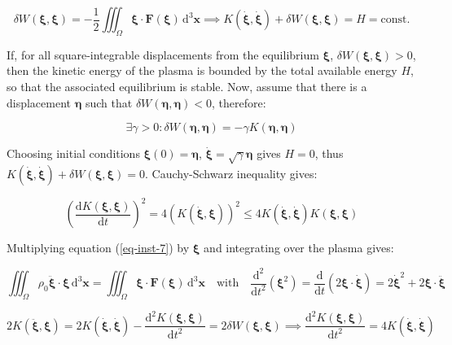 \begin{equation}
    \delta W(\boldsymbol{\xi},\boldsymbol{\xi})=-\frac{1}{2}\iiint_\Omega\boldsymbol{\xi}\cdot\mathbf{F}(\boldsymbol{\xi})\,\mathrm{d}^3\mathbf{x}\implies K(\dot{\boldsymbol{\xi}},\dot{\boldsymbol{\xi}})+\delta W(\boldsymbol{\xi},\boldsymbol{\xi})=H=\text{const.}
\end{equation}

If, for all square-integrable displacements from the equilibrium $\boldsymbol{\xi}$, $\delta W(\boldsymbol{\xi},\boldsymbol{\xi})>0$, then the kinetic energy of the plasma is bounded by the total available energy $H$, so that the associated equilibrium is stable. Now, assume that there is a displacement $\boldsymbol{\eta}$ such that $\delta W(\boldsymbol{\eta},\boldsymbol{\eta})<0$, therefore:

\begin{equation}
     \label{eq-inst-22}
    \exists\gamma>0:\delta W(\boldsymbol{\eta},\boldsymbol{\eta})=-\gamma K(\boldsymbol{\eta},\boldsymbol{\eta})
\end{equation}

Choosing initial conditions $\boldsymbol{\xi}(0)=\boldsymbol{\eta}$, $\dot{\boldsymbol{\xi}}=\sqrt{\gamma}\boldsymbol{\eta}$ gives $H=0$, thus $K(\dot{\boldsymbol{\xi}},\dot{\boldsymbol{\xi}})+\delta W(\boldsymbol{\xi},\boldsymbol{\xi})=0$. Cauchy-Schwarz inequality gives:

\begin{equation}
    \left(\frac{\mathrm{d}K(\boldsymbol{\xi},\boldsymbol{\xi})}{\mathrm{d}t}\right)^2=4\left(K(\dot{\boldsymbol{\xi}},\boldsymbol{\xi})\right)^2\leq4K(\dot{\boldsymbol{\xi}},\dot{\boldsymbol{\xi}})K(\boldsymbol{\xi},\boldsymbol{\xi})
\end{equation}

Multiplying equation (\ref{eq-inst-7}) by $\boldsymbol{\xi}$ and integrating over the plasma gives:

\begin{equation}
    \iiint_\Omega\rho_0\ddot{\boldsymbol{\xi}}\cdot\boldsymbol{\xi}\,\mathrm{d}^3\mathbf{x}=\iiint_\Omega\boldsymbol{\xi}\cdot\mathbf{F}(\boldsymbol{\xi})\,\mathrm{d}^3\mathbf{x}\quad\text{with}\quad\frac{\mathrm{d}^2}{\mathrm{d}t^2}\left(\boldsymbol{\xi}^2\right)=\frac{\mathrm{d}}{\mathrm{d}t}(2\boldsymbol{\xi}\cdot\dot{\boldsymbol{\xi}})=2\dot{\boldsymbol{\xi}}^2+2\boldsymbol{\xi}\cdot\ddot{\boldsymbol{\xi}}
\end{equation}

\begin{equation}
    2K(\ddot{\boldsymbol{\xi}},\boldsymbol{\xi})=2K(\dot{\boldsymbol{\xi}},\dot{\boldsymbol{\xi}})-\frac{\mathrm{d}^2K(\boldsymbol{\xi},\boldsymbol{\xi})}{\mathrm{d}t^2}=2\delta W(\boldsymbol{\xi},\boldsymbol{\xi})\implies\frac{\mathrm{d}^2K(\boldsymbol{\xi},\boldsymbol{\xi})}{\mathrm{d}t^2}=4K(\dot{\boldsymbol{\xi}},\dot{\boldsymbol{\xi}})
\end{equation}

